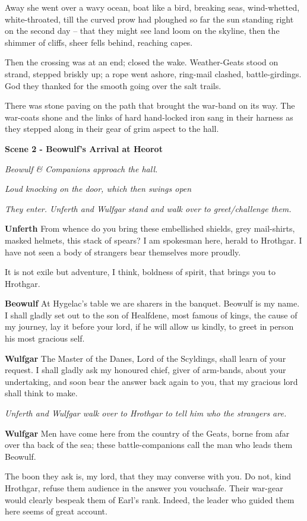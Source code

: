 \documentclass[a4paper]{article}
\begin{document}
{Away she went over a wavy ocean,
boat like a bird, breaking seas,
wind-whetted, white-throated,
till the curved prow had ploughed so far
the sun standing right on the second day –
that they might see land loom on the skyline,
then the shimmer of cliffs, sheer fells behind,
reaching capes.

Then the crossing was at an end;
closed the wake. Weather-Geats
stood on strand, stepped briskly up;
a rope went ashore, ring-mail clashed,
battle-girdings. God they thanked
for the smooth going over the salt trails.

There was stone paving on the path that brought
the war-band on its way. The war-coats shone
and the links of hard hand-locked iron
sang in their harness as they stepped along
in their gear of grim aspect to the hall.

\centerline{\textbf{Scene 2 - Beowulf's Arrival at Heorot}}
\centerline{\textit{Beowulf \& Companions approach the hall.}}
\centerline{\textit{Loud knocking on the door, which then swings open}}
\centerline{\textit{They enter. Unferth and Wulfgar stand and walk over to greet/challenge them.}}

\textbf{Unferth} From whence do you bring these embellished shields, 
grey mail-shirts, masked helmets, 
this stack of spears? I am spokesman here,
herald to Hrothgar. I have not seen
a body of strangers bear themselves more proudly.

It is not exile but adventure, I think,
boldness of spirit, that brings you to Hrothgar.

\textbf{Beowulf} At Hygelac's table we are sharers in the banquet.
Beowulf is my name.
I shall gladly set out to the son of Healfdene,
most famous of kings, the cause of my journey,
lay it before your lord, if he will allow us kindly,
to greet in person his most gracious self.

\textbf{Wulfgar} The Master of the Danes,
Lord of the Scyldings, shall learn of your request.
I shall gladly ask my honoured chief,
giver of arm-bands, about your undertaking,
and soon bear the answer back again to you,
that my gracious lord shall think to make.

\centerline{\textit{Unferth and Wulfgar walk over to Hrothgar to tell him who the strangers are.}}

\textbf{Wulfgar} Men have come here from the country of the Geats,
borne from afar over tha back of the sea;
these battle-companions call the man who leads them Beowulf.

The boon they ask is, my lord, that they may converse with you. 
Do not, kind Hrothgar, refuse them audience in the answer you vouchsafe.
Their war-gear would clearly bespeak them of Earl's rank. 
Indeed, the leader who guided them here seems of great account.

}
\end{document}
